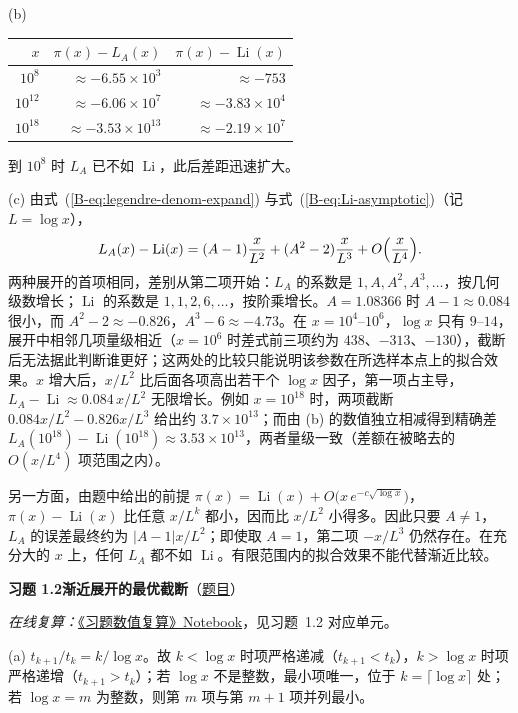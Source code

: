 \documentclass[11pt,a4paper]{article}
\DeclareMathOperator{\Li}{Li}
\newcommand{\bref}[1]{\ref*{B-#1}}
\newcommand{\Sol}[2]{%
  \par\addvspace{1.2em}\noindent
  \hypertarget{s:#1}{}\textbf{习题 #1\quad #2}\hfill{\small（\hyperlink{q:#1}{题目}）}\par
  \nopagebreak\smallskip}
\begin{document}
(b)
\begin{center}
\begin{tabular}{rrr}
\toprule
$x$ & $\pi(x)-L_A(x)$ & $\pi(x)-\Li(x)$\\
\midrule
$10^8$ & $\approx-6.55\times10^{3}$ & $\approx-753$\\
$10^{12}$ & $\approx-6.06\times10^{7}$ & $\approx-3.83\times10^{4}$\\
$10^{18}$ & $\approx-3.53\times10^{13}$ & $\approx-2.19\times10^{7}$\\
\bottomrule
\end{tabular}
\end{center}
到 $10^8$ 时 $L_A$ 已不如 $\Li$，此后差距迅速扩大。

(c) 由式~(\bref{eq:legendre-denom-expand}) 与式~(\bref{eq:Li-asymptotic})（记 $L=\log x$），
\[
  L_A(x)-\Li(x)=(A-1)\frac{x}{L^2}+(A^2-2)\frac{x}{L^3}+O\Bigl(\frac{x}{L^4}\Bigr).
\]
两种展开的首项相同，差别从第二项开始：$L_A$ 的系数是 $1,A,A^2,A^3,\dots$，按几何级数增长；$\Li$ 的系数是 $1,1,2,6,\dots$，按阶乘增长。$A=1.08366$ 时 $A-1\approx0.084$ 很小，而 $A^2-2\approx-0.826$，$A^3-6\approx-4.73$。在 $x=10^4$--$10^6$，$\log x$ 只有 $9$--$14$，展开中相邻几项量级相近（$x=10^6$ 时差式前三项约为 $438$、$-313$、$-130$），截断后无法据此判断谁更好；这两处的比较只能说明该参数在所选样本点上的拟合效果。$x$ 增大后，$x/L^2$ 比后面各项高出若干个 $\log x$ 因子，第一项占主导，$L_A-\Li\approx0.084\,x/L^2$ 无限增长。例如 $x=10^{18}$ 时，两项截断 $0.084x/L^2-0.826x/L^3$ 给出约 $3.7\times10^{13}$；而由 (b) 的数值独立相减得到精确差 $L_A(10^{18})-\Li(10^{18})\approx3.53\times10^{13}$，两者量级一致（差额在被略去的 $O(x/L^4)$ 项范围之内）。

另一方面，由题中给出的前提 $\pi(x)=\Li(x)+O\bigl(x\,e^{-c\sqrt{\log x}}\bigr)$，$\pi(x)-\Li(x)$ 比任意 $x/L^k$ 都小，因而比 $x/L^2$ 小得多。因此只要 $A\ne1$，$L_A$ 的误差最终约为 $|A-1|x/L^2$；即使取 $A=1$，第二项 $-x/L^3$ 仍然存在。在充分大的 $x$ 上，任何 $L_A$ 都不如 $\Li$。有限范围内的拟合效果不能代替渐近比较。

\Sol{1.2}{渐近展开的最优截断}
\emph{在线复算：}\href{https://colab.research.google.com/github/lichengtong123/lichengtong-RH/blob/main/\%E4\%B9\%A0\%E9\%A2\%98\%E4\%B8\%8E\%E8\%A7\%A3\%E7\%AD\%94/\%E4\%B9\%A0\%E9\%A2\%98\%E6\%95\%B0\%E5\%80\%BC\%E5\%A4\%8D\%E7\%AE\%97.ipynb}{《习题数值复算》Notebook}，见习题~1.2 对应单元。

(a) $t_{k+1}/t_k=k/\log x$。故 $k<\log x$ 时项严格递减（$t_{k+1}<t_k$），$k>\log x$ 时项严格递增（$t_{k+1}>t_k$）；若 $\log x$ 不是整数，最小项唯一，位于 $k=\lceil\log x\rceil$ 处；若 $\log x=m$ 为整数，则第 $m$ 项与第 $m+1$ 项并列最小。
\end{document}
